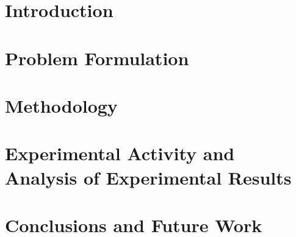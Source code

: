 \documentclass[11pt,a4paper]{article}
\begin{document}



\section{Introduction}
\label{sec:introduction}


\section{Problem Formulation}
\label{sec:problem_statement}


\section{Methodology}
\label{sec:methodology}


\section{Experimental Activity and Analysis of Experimental Results}
\label{sec:results}


\section{Conclusions and Future Work}
\label{sec:conclusions}

\end{document}
